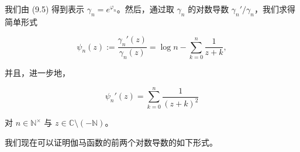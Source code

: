 我们由 (9.5) 得到表示 $ \gamma_n = e^{\varphi_n} $。然后，通过取 $ \gamma_n $ 的对数导数 $ \gamma_n'/\gamma_n $，我们求得简单形式

\begin{equation}
\psi_n(z) := \frac{\gamma_n'(z)}{\gamma_n(z)} = \log n - \sum_{k=0}^{n} \frac{1}{z+k} ,\tag{9.13}
\end{equation}

并且，进一步地，

\begin{equation}
\psi_n'(z) = \sum_{k=0}^{n} \frac{1}{(z+k)^{2}}\tag{9.14}
\end{equation}

对 $ n \in \mathbb{N}^{\times} $ 与 $ z \in \mathbb{C}\setminus(-\mathbb{N}) $。

我们现在可以证明伽马函数的前两个对数导数的如下形式。

